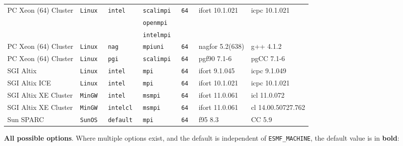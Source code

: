 \begin{tabular}{lllllll}
PC Xeon (64) Cluster  &\tt Linux  &\tt intel        &\tt scalimpi   &\tt 64              & ifort \footnotesize 10.1.021       & icpc \footnotesize 10.1.021     \\
                      &           &                 &\tt openmpi    &                    &                                    &                                 \\
                      &           &                 &\tt intelmpi   &                    &                                    &                                 \\
PC Xeon (64) Cluster  &\tt Linux  &\tt nag          &\tt mpiuni     &\tt 64              & nagfor \footnotesize 5.2(638)      & g++  \footnotesize 4.1.2        \\
PC Xeon (64) Cluster  &\tt Linux  &\tt pgi          &\tt scalimpi   &\tt 64              & pgf90 \footnotesize 7.1-6          & pgCC \footnotesize 7.1-6        \\
SGI Altix             &\tt Linux  &\tt intel        &\tt mpi        &\tt 64              & ifort \footnotesize 9.1.045        & icpc \footnotesize 9.1.049      \\
SGI Altix ICE         &\tt Linux  &\tt intel        &\tt mpi        &\tt 64              & ifort \footnotesize 10.1.021       & icpc \footnotesize 10.1.021     \\
SGI Altix XE Cluster  &\tt MinGW  &\tt intel        &\tt msmpi      &\tt 64              & ifort \footnotesize 11.0.061       & icl  \footnotesize 11.0.072     \\
SGI Altix XE Cluster  &\tt MinGW  &\tt intelcl      &\tt msmpi      &\tt 64              & ifort \footnotesize 11.0.061       & cl  \footnotesize 14.00.50727.762 \\
Sun SPARC             &\tt SunOS  &\tt default      &\tt mpi        &\tt 64              & f95 \footnotesize 8.3              & CC \footnotesize 5.9              
\end{tabular}

\vspace{1ex}

{\bf All possible options}. Where multiple options exist, and the default is independent
of {\tt ESMF\_MACHINE}, the default value is in {\bf bold}:

